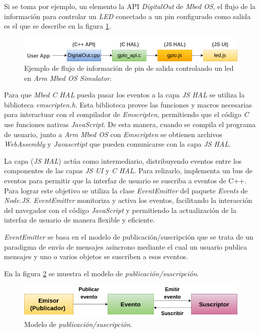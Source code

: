 Si se toma por ejemplo, un elemento la API \textit{DigitalOut} de \textit{Mbed OS}, el flujo de la información para controlar un \textit{LED} conectado a un pin configurado como salida es el que se describe en la figura \ref{fig:flujoGpio-LedMbed}.

\begin{figure}[ht]
	\centering
	\includegraphics[scale=.50]{./Figures/flujoGpio-LedMbed.png}
	\caption{Ejemplo de flujo de información de pin de salida controlando un led en \textit{Arm Mbed OS Simulator}.}
	\label{fig:flujoGpio-LedMbed}
\end{figure}

Para que \textit{Mbed C HAL} pueda pasar los  eventos a la capa \textit{JS HAL} se utiliza la biblioteca \textit{emscripten.h}. Esta biblioteca provee las funciones y macros necesarias para interactuar con el compilador de \textit{Emscripten}, permitiendo que el código \textit{C} use funciones nativas \textit{JavaScript}. De esta manera, cuando se compila el programa de usuario, junto a \textit{Arm Mbed OS} con \textit{Emscripten} se obtienen archivos \textit{WebAssembly} y \textit{Javascrtipt} que pueden comunicarse con la capa \textit{JS HAL}.

La capa (\textit{JS HAL}) actúa como intermediario, distribuyendo eventos entre los componentes de las capas \textit{JS UI} y \textit{C HAL}. Para relizarlo, implementa un bus de eventos para permitir que la interfaz de usuario se suscriba a eventos de C++.
Para lograr este objetivo se utiliza la clase \textit{EventEmitter} del paquete \textit{Events} de \textit{Node.JS}. \textit{EventEmitter} monitoriza y activa los eventos, facilitando la interacción del navegador con el código \textit{JavaScript} y permitiendo la actualización de la interfaz de usuario de manera flexible y eficiente. 

\textit{EventEmitter} se basa en el modelo de publicación/suscripción que se trata de un paradigma de envío de mensajes asíncrono mediante el cual un usuario publica mensajes y uno o varios objetos se suscriben a esos eventos.

En la figura \ref{fig:PublicarSuscribir} se muestra el modelo de \textit{publicación/suscripción}.

\begin{figure}[ht]
	\centering
	\includegraphics[scale=.49]{./Figures/PublicarSuscribir.png}
	\caption{Modelo de \textit{publicación/suscripción}.}
	\label{fig:PublicarSuscribir}
\end{figure}

